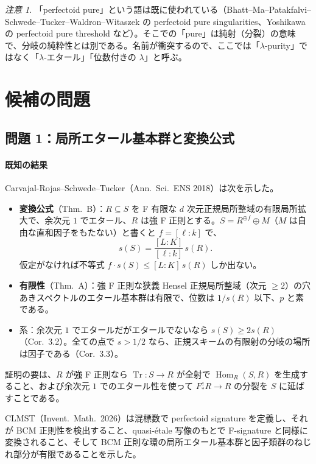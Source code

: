 \documentclass[11pt,a4paper]{ltjsarticle}
\theoremstyle{plain}
\theoremstyle{definition}
\theoremstyle{remark}
\newtheorem*{remark}{注意}
\theoremstyle{plain}
\newcommand{\Hom}{\operatorname{Hom}}
\newcommand{\Tr}{\operatorname{Tr}}
\begin{document}
\begin{remark}
「perfectoid pure」という語は既に使われている（Bhatt--Ma--Patakfalvi--Schwede--Tucker--Waldron--Witaszek の perfectoid pure singularities、Yoshikawa の perfectoid pure threshold など）。そこでの「pure」は純射（分裂）の意味で、分岐の純粋性とは別である。名前が衝突するので、ここでは「$\lambda$-purity」ではなく「$\lambda$-エタール」「位数付きの $\lambda$」と呼ぶ。
\end{remark}

\section{候補の問題}

\subsection{問題 1：局所エタール基本群と変換公式}

\paragraph{既知の結果}
Carvajal-Rojas--Schwede--Tucker（Ann.\ Sci.\ ENS 2018）は次を示した。
\begin{itemize}
  \item \textbf{変換公式}（Thm.~B）：$R\subseteq S$ を F 有限な $d$ 次元正規局所整域の有限局所拡大で、余次元 $1$ でエタール、$R$ は強 F 正則とする。$S = R^{\oplus f}\oplus M$（$M$ は自由な直和因子をもたない）と書くと $f = [\ell:k]$ で、
  \[
    s(S) = \frac{[L:K]}{[\ell:k]}\,s(R).
  \]
  仮定がなければ不等式 $f\cdot s(S)\le[L:K]\,s(R)$ しか出ない。
  \item \textbf{有限性}（Thm.~A）：強 F 正則な狭義 Hensel 正規局所整域（次元 $\ge2$）の穴あきスペクトルのエタール基本群は有限で、位数は $1/s(R)$ 以下、$p$ と素である。
  \item 系：余次元 $1$ でエタールだがエタールでないなら $s(S)\ge 2s(R)$（Cor.~3.2）。全ての点で $s>1/2$ なら、正規スキームの有限射の分岐の場所は因子である（Cor.~3.3）。
\end{itemize}
証明の要は、$R$ が強 F 正則なら $\Tr\colon S\to R$ が全射で $\Hom_R(S,R)$ を生成すること、および余次元 $1$ でのエタール性を使って $F^e_*R\to R$ の分裂を $S$ に延ばすことである。

CLMST（Invent.\ Math.\ 2026）は混標数で perfectoid signature を定義し、それが BCM 正則性を検出すること、quasi-étale 写像のもとで F-signature と同様に変換されること、そして BCM 正則な環の局所エタール基本群と因子類群のねじれ部分が有限であることを示した。
\end{document}

